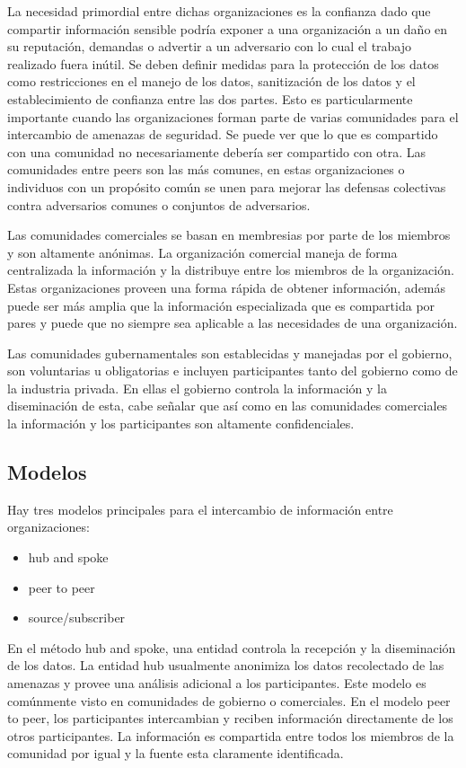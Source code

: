 La necesidad primordial entre dichas organizaciones es la confianza dado que 
compartir información sensible podría exponer a una organización a un daño en su 
reputación, demandas o advertir a un adversario con lo cual el trabajo realizado 
fuera inútil. Se deben definir medidas para la protección de los datos como 
restricciones en el manejo de los datos, sanitización de los datos y el 
establecimiento de confianza entre las dos partes. Esto es particularmente 
importante cuando las organizaciones forman parte de varias comunidades para el 
intercambio de amenazas de seguridad. Se puede ver que lo que es compartido con 
una comunidad no necesariamente debería ser compartido con otra.
Las comunidades entre peers son las más comunes, en estas organizaciones o 
individuos con un propósito común se unen para mejorar las defensas colectivas 
contra adversarios comunes o conjuntos de adversarios.

Las comunidades comerciales se basan en membresias por parte de los miembros y 
son altamente anónimas. La organización comercial maneja de forma centralizada 
la información y la distribuye entre los miembros de la organización. Estas 
organizaciones proveen una forma rápida de obtener información, además puede ser 
más amplia que la información especializada que es compartida por pares y puede 
que no siempre sea aplicable a las necesidades de una organización.

Las comunidades gubernamentales  son establecidas y manejadas por el gobierno, 
son voluntarias u obligatorias e incluyen participantes tanto del gobierno como 
de la industria privada. En ellas el gobierno controla la información y la 
diseminación de esta, cabe señalar que así como en las comunidades comerciales 
la información y los participantes son altamente confidenciales.
\subsection{Modelos} %
Hay tres modelos principales para el intercambio de información entre 
organizaciones:
\begin{itemize}
  \item hub and spoke
  \item peer to peer
  \item source/subscriber
\end{itemize}
En el método hub and spoke, una entidad controla la recepción y la diseminación 
de los datos. La entidad hub usualmente anonimiza los datos 
recolectado de las amenazas y provee una análisis adicional a los participantes. 
Este modelo es comúnmente visto en comunidades de gobierno o comerciales.
En el modelo peer to peer, los participantes intercambian y reciben información 
directamente de los otros participantes. La información es compartida entre 
todos los miembros de la comunidad por igual y la fuente esta claramente 
identificada.


